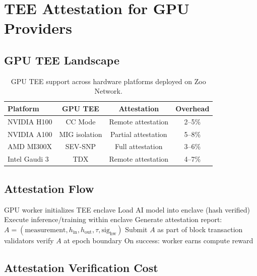 \section{TEE Attestation for GPU Providers}

\label{sec:tee}

\subsection{GPU TEE Landscape}

\begin{table}[t]
\centering
\begin{tabular}{lccc}
\toprule
\textbf{Platform} & \textbf{GPU TEE} & \textbf{Attestation} & \textbf{Overhead} \\
\midrule
NVIDIA H100 & CC Mode & Remote attestation & 2--5\% \\
NVIDIA A100 & MIG isolation & Partial attestation & 5--8\% \\
AMD MI300X & SEV-SNP & Full attestation & 3--6\% \\
Intel Gaudi 3 & TDX & Remote attestation & 4--7\% \\
\bottomrule
\end{tabular}
\caption{GPU TEE support across hardware platforms deployed on Zoo Network.}
\label{tab:tee}
\end{table}

\subsection{Attestation Flow}

\begin{algorithm}[t]
\caption{GPU TEE Attestation on Zoo}
\label{alg:tee}
\begin{algorithmic}[1]
\STATE GPU worker initializes TEE enclave
\STATE Load AI model into enclave (hash verified)
\STATE Execute inference/training within enclave
\STATE Generate attestation report:
\STATE \quad $A = (\text{measurement}, h_{\text{in}}, h_{\text{out}}, \tau, \text{sig}_{\text{hw}})$
\STATE Submit $A$ as part of \Quasar{} block transaction
\STATE \PoAI{} validators verify $A$ at epoch boundary
\STATE On success: worker earns compute reward
\end{algorithmic}
\end{algorithm}

\subsection{Attestation Verification Cost}

